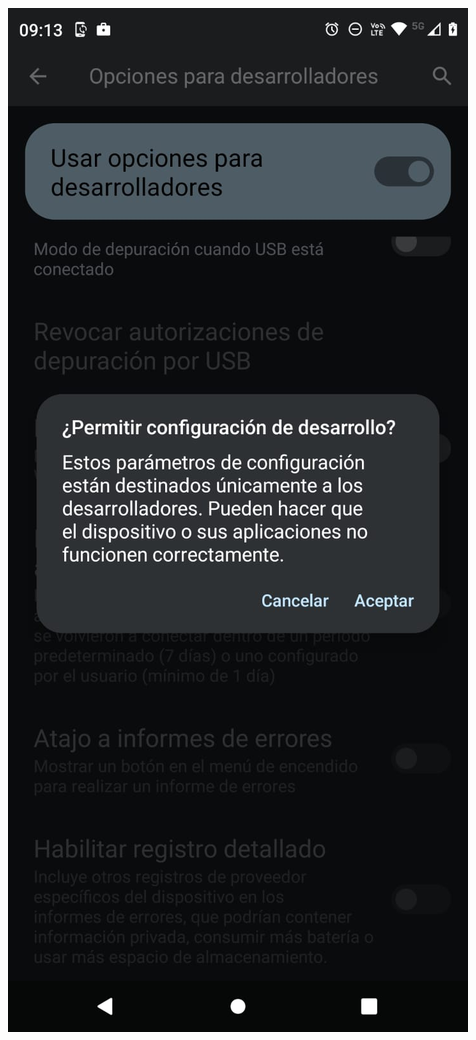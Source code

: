 \begin{frame}
\begin{columns}
\begin{center}
\includegraphics[width=0.95\linewidth]{01_Configurar/PermitirHabiliarOpcionesDesarrollo.jpg}    
\end{center}
\end{columns}
\end{frame}



